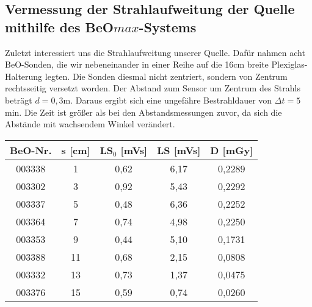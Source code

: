 \subsection{Vermessung der Strahlaufweitung der Quelle mithilfe des BeO$max$-Systems}

Zuletzt interessiert uns die Strahlaufweitung unserer Quelle. Dafür nahmen acht BeO-Sonden, die wir nebeneinander in einer Reihe auf die 16cm breite Plexiglas-Halterung legten. Die Sonden diesmal nicht zentriert, sondern von Zentrum rechtsseitig versetzt worden. Der Abstand zum Sensor um Zentrum des Strahls beträgt $d = 0,3$m. Daraus ergibt sich eine ungefähre Bestrahldauer von $\Delta t = 5$min. Die Zeit ist größer als bei den Abstandsmessungen zuvor, da sich die Abstände mit wachsendem Winkel verändert.

	\begin{center}
		\begin{tabular}{c|c|c|c|c}
				\textbf{BeO-Nr.}& \textbf{s} [cm] & \textbf{LS$_0$} [mVs] & \textbf{LS} [mVs] & \textbf{D} [mGy] \\
		 \hline 003338 &  1 & 0,62 & 6,17 & 0,2289 \\
				003302 &  3 & 0,92 & 5,43 & 0,2292 \\
				003337 &  5 & 0,48 & 6,36 & 0,2252 \\
				003364 &  7 & 0,74 & 4,98 & 0,2250 \\
				003353 &  9 & 0,44 & 5,10 & 0,1731 \\
				003388 & 11	& 0,68 & 2,15 & 0,0808 \\
				003332 & 13 & 0,73 & 1,37 & 0,0475 \\
				003376 & 15 & 0,59 & 0,74 & 0,0260 \\
		\end{tabular}
	\end{center} 
